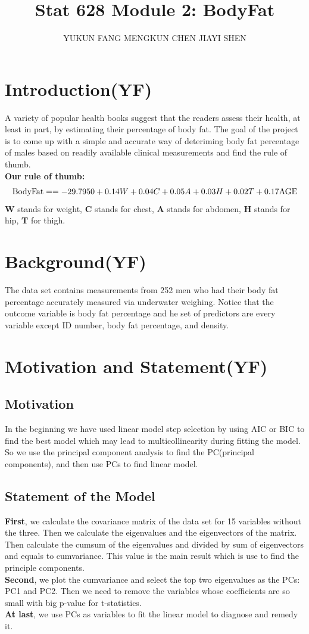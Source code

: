 \documentclass[12pt]{article}
\title{\vspace{-4em}Stat 628 Module 2: BodyFat}
\author{YUKUN FANG \quad MENGKUN CHEN \quad JIAYI SHEN}
\date{}
\begin{document}
\sffamily

\maketitle
\section{\sffamily Introduction(YF)}
A variety of popular health books suggest that the readers assess their 
health, at least in part, by estimating their percentage of body fat.
The goal of the project is to come up with 
a simple and accurate way of deteriming body fat percentage of males
based on readily available clinical measurements and find the rule of thumb.\\
\textbf{Our rule of thumb:} $$ {\rm BodyFat} =  = -29.7950 + 0.14W + 0.04C + 0.05A+ 0.03H +0.02T + 0.17{\rm AGE}$$
\textbf{W} stands for weight, \textbf{C} stands for chest, \textbf{A} stands for abdomen, \textbf{H} stands for hip, \textbf{T} for thigh.
\section{\sffamily Background(YF)}
The data set contains measurements from 252 men who had their body fat 
percentage accurately measured via underwater weighing. Notice that the 
outcome variable is body fat percentage and he set of predictors are 
every variable except ID number, body fat percentage, and density.
\section{\sffamily Motivation and Statement(YF)}
\subsection{\sffamily Motivation}
In the beginning we have used linear model step selection by using 
AIC or BIC to find the best model which may lead to multicollinearity during fitting the model.
So we use the principal component analysis to find the PC(principal components), and
then use PCs to find linear model.

\subsection{\sffamily Statement of the Model}
\textbf{First}, we calculate the covariance matrix of the data set for 15 variables without the three.
Then we calculate the eigenvalues and the eigenvectors of the matrix.
Then calculate the cumsum of the eigenvalues and divided by sum of eigenvectors and equals to cumvariance. 
This value is the main result which is use to find the principle components.\\
\textbf{Second}, we plot the cumvariance and select the top two eigenvalues as the PCs: PC1 and PC2.
Then we need to remove the variables whose coefficients are so small with big p-value for t-statistics.\\
\textbf{At last}, we use PCs as variables to fit the linear model to diagnose and remedy it.
\end{document}

